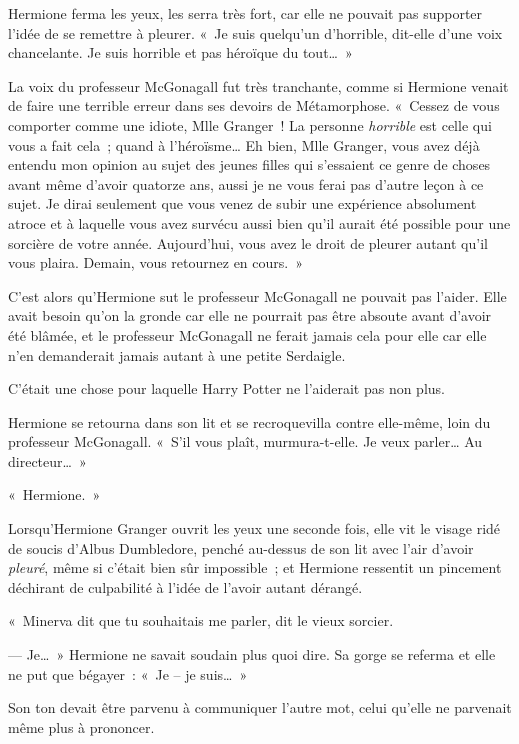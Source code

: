 Hermione ferma les yeux, les serra très fort, car elle ne pouvait pas supporter l'idée de se remettre à pleurer.
«~Je suis quelqu'un d'horrible, dit-elle d'une voix chancelante.
Je suis horrible et pas héroïque du tout…~»

La voix du professeur McGonagall fut très tranchante, comme si Hermione venait de faire une terrible erreur dans ses devoirs de Métamorphose.
«~Cessez de vous comporter comme une idiote, Mlle Granger~!
La personne \emph{horrible} est celle qui vous a fait cela~; quand à l'héroïsme…
Eh bien, Mlle Granger, vous avez déjà entendu mon opinion au sujet des jeunes filles qui s'essaient ce genre de choses avant même d'avoir quatorze ans, aussi je ne vous ferai pas d'autre leçon à ce sujet.
Je dirai seulement que vous venez de subir une expérience absolument atroce et à laquelle vous avez survécu aussi bien qu'il aurait été possible pour une sorcière de votre année.
Aujourd'hui, vous avez le droit de pleurer autant qu'il vous plaira.
Demain, vous retournez en cours.~»

C'est alors qu'Hermione sut le professeur McGonagall ne pouvait pas l'aider.
Elle avait besoin qu'on la gronde car elle ne pourrait pas être absoute avant d'avoir été blâmée, et le professeur McGonagall ne ferait jamais cela pour elle car elle n'en demanderait jamais autant à une petite Serdaigle.

C'était une chose pour laquelle Harry Potter ne l'aiderait pas non plus.

Hermione se retourna dans son lit et se recroquevilla contre elle-même, loin du professeur McGonagall.
«~S'il vous plaît, murmura-t-elle.
Je veux parler…
Au directeur…~»

\later

«~Hermione.~»

Lorsqu'Hermione Granger ouvrit les yeux une seconde fois, elle vit le visage ridé de soucis d'Albus Dumbledore, penché au-dessus de son lit avec l'air d'avoir \emph{pleuré}, même si c'était bien sûr impossible~; et Hermione ressentit un pincement déchirant de culpabilité à l'idée de l'avoir autant dérangé.

«~Minerva dit que tu souhaitais me parler, dit le vieux sorcier.

--- Je…~» Hermione ne savait soudain plus quoi dire.
Sa gorge se referma et elle ne put que bégayer~: «~Je -- je suis…~»

Son ton devait être parvenu à communiquer l'autre mot, celui qu'elle ne parvenait même plus à prononcer.

